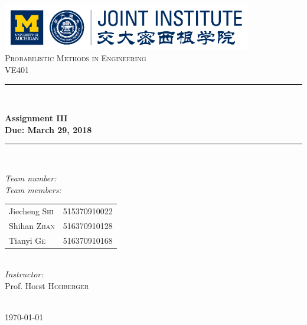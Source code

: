 \begin{titlepage}

\newcommand{\HRule}{\rule{\linewidth}{0.5mm}}

\center

\includegraphics[height=0.8in]{images/logo.png}\\[1cm]

\textsc{\Large Probabilistic Methods in Engineering}\\[0.4cm]
\textsc{\large VE401}\\[0.4cm]

\HRule \\[0.4cm]
{
    \bfseries
    {\huge Assignment III}\\[0.3cm]
    {\large Due: March 29, 2018}\\[0.2cm]
    \HRule \\[1.5cm]
}

\begin{minipage}{0.4\textwidth}

\large
\emph{Team number:} \quad{}\\

\emph{Team members:}\\

\begin{tabular}{ll}
    Jiecheng  \textsc{Shi} & 515370910022\\
    Shihan  \textsc{Zhan} & 516370910128\\
    Tianyi  \textsc{Ge} & 516370910168\\
\end{tabular}\\[1cm]


\emph{Instructor:}\\[0.1cm]
Prof. Horst \textsc{Hohberger}

\end{minipage}\\[2cm]

{\large \today}\\[2cm]

\vfill

\end{titlepage}

\clearpage
